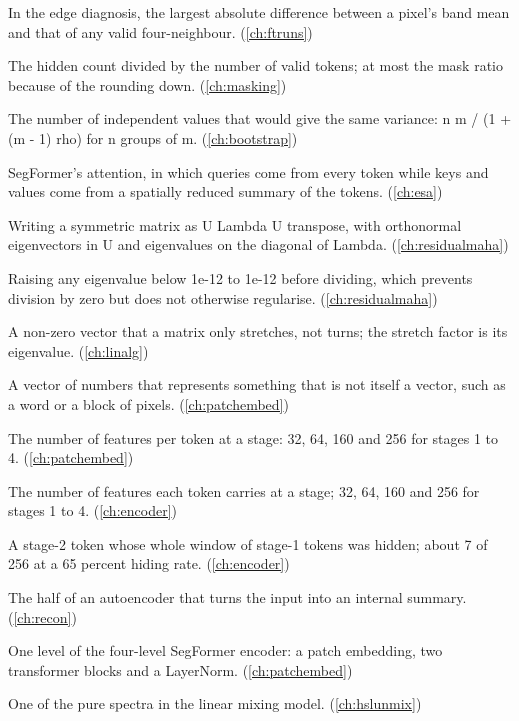 \begin{description}[style=nextline,leftmargin=1.2em,font=\normalfont\bfseries]
\item[Edge strength] In the edge diagnosis, the largest absolute difference between a pixel's band mean and that of any valid four-neighbour. (\cref{ch:ftruns})
\item[Effective mask ratio] The hidden count divided by the number of valid tokens; at most the mask ratio because of the rounding down. (\cref{ch:masking})
\item[Effective sample size] The number of independent values that would give the same variance: n m / (1 + (m - 1) rho) for n groups of m. (\cref{ch:bootstrap})
\item[Efficient self-attention (ESA)] SegFormer's attention, in which queries come from every token while keys and values come from a spatially reduced summary of the tokens. (\cref{ch:esa})
\item[Eigen-decomposition] Writing a symmetric matrix as U Lambda U transpose, with orthonormal eigenvectors in U and eigenvalues on the diagonal of Lambda. (\cref{ch:residualmaha})
\item[Eigenvalue floor] Raising any eigenvalue below 1e-12 to 1e-12 before dividing, which prevents division by zero but does not otherwise regularise. (\cref{ch:residualmaha})
\item[Eigenvector] A non-zero vector that a matrix only stretches, not turns; the stretch factor is its eigenvalue. (\cref{ch:linalg})
\item[Embedding] A vector of numbers that represents something that is not itself a vector, such as a word or a block of pixels. (\cref{ch:patchembed})
\item[Embedding dimension] The number of features per token at a stage: 32, 64, 160 and 256 for stages 1 to 4. (\cref{ch:patchembed})
\item[Embedding width] The number of features each token carries at a stage; 32, 64, 160 and 256 for stages 1 to 4. (\cref{ch:encoder})
\item[Empty token] A stage-2 token whose whole window of stage-1 tokens was hidden; about 7 of 256 at a 65 percent hiding rate. (\cref{ch:encoder})
\item[Encoder] The half of an autoencoder that turns the input into an internal summary. (\cref{ch:recon})
\item[Encoder stage] One level of the four-level SegFormer encoder: a patch embedding, two transformer blocks and a LayerNorm. (\cref{ch:patchembed})
\item[Endmember] One of the pure spectra in the linear mixing model. (\cref{ch:hslunmix})

\end{description}
